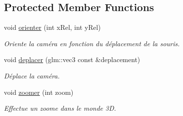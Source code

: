 \subsection*{Protected Member Functions}
\begin{DoxyCompactItemize}
\item 
\hypertarget{classCameraFPS_a0b06955072fe29f6cf8a5c76828025fd}{void \hyperlink{classCameraFPS_a0b06955072fe29f6cf8a5c76828025fd}{orienter} (int x\+Rel, int y\+Rel)}\label{classCameraFPS_a0b06955072fe29f6cf8a5c76828025fd}

\begin{DoxyCompactList}\small\item\em Oriente la caméra en fonction du déplacement de la souris. \end{DoxyCompactList}\item 
\hypertarget{classCameraFPS_af71850751b121f12f25b03f75e836cc5}{void \hyperlink{classCameraFPS_af71850751b121f12f25b03f75e836cc5}{deplacer} (glm\+::vec3 const \&deplacement)}\label{classCameraFPS_af71850751b121f12f25b03f75e836cc5}

\begin{DoxyCompactList}\small\item\em Déplace la caméra. \end{DoxyCompactList}\item 
\hypertarget{classCameraFPS_a073a8db2ee3711140d0b0fc1a36086cd}{void \hyperlink{classCameraFPS_a073a8db2ee3711140d0b0fc1a36086cd}{zoomer} (int zoom)}\label{classCameraFPS_a073a8db2ee3711140d0b0fc1a36086cd}

\begin{DoxyCompactList}\small\item\em Effectue un zoome dans le monde 3\+D. \end{DoxyCompactList}\end{DoxyCompactItemize}
